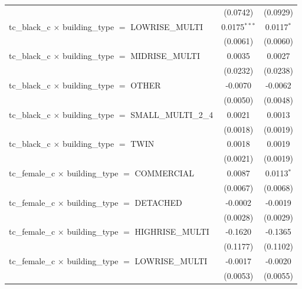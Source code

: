 \begin{tabular}{lcc}
                                                                       & (0.0742)       & (0.0929)\\   
   tc\_black\_c $\times$ building\_type $=$ LOWRISE\_MULTI             & 0.0175$^{***}$ & 0.0117$^{*}$\\   
                                                                       & (0.0061)       & (0.0060)\\   
   tc\_black\_c $\times$ building\_type $=$ MIDRISE\_MULTI             & 0.0035         & 0.0027\\   
                                                                       & (0.0232)       & (0.0238)\\   
   tc\_black\_c $\times$ building\_type $=$ OTHER                      & -0.0070        & -0.0062\\   
                                                                       & (0.0050)       & (0.0048)\\   
   tc\_black\_c $\times$ building\_type $=$ SMALL\_MULTI\_2\_4         & 0.0021         & 0.0013\\   
                                                                       & (0.0018)       & (0.0019)\\   
   tc\_black\_c $\times$ building\_type $=$ TWIN                       & 0.0018         & 0.0019\\   
                                                                       & (0.0021)       & (0.0019)\\   
   tc\_female\_c $\times$ building\_type $=$ COMMERCIAL                & 0.0087         & 0.0113$^{*}$\\   
                                                                       & (0.0067)       & (0.0068)\\   
   tc\_female\_c $\times$ building\_type $=$ DETACHED                  & -0.0002        & -0.0019\\   
                                                                       & (0.0028)       & (0.0029)\\   
   tc\_female\_c $\times$ building\_type $=$ HIGHRISE\_MULTI           & -0.1620        & -0.1365\\   
                                                                       & (0.1177)       & (0.1102)\\   
   tc\_female\_c $\times$ building\_type $=$ LOWRISE\_MULTI            & -0.0017        & -0.0020\\   
                                                                       & (0.0053)       & (0.0055)\\   

\end{tabular}

